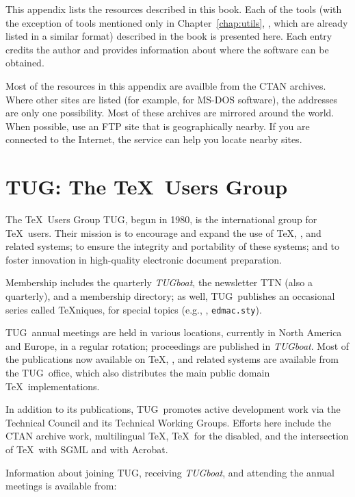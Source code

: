
This appendix lists the resources described in this book.  Each of the tools
(with the exception of tools mentioned only in Chapter~\ref{chap:utils},
\textit{}, which are already listed in a similar format)
described in the book is presented here.  Each entry credits the author and
provides information about where the software can be obtained.

Most of the resources in this appendix are availble from the CTAN archives.
Where other sites are listed (for example,  for
MS-DOS software), the addresses are only one possibility.  Most of these
archives are mirrored around the world.  When possible, use an FTP site
that is geographically nearby.  If you are connected to the Internet, the
 service can help you locate nearby sites.

\section{TUG: The \TeX\ Users Group}

\def\tug{{\sc TUG}}
\def\TUB{{\sl TUGboat\/}}

The \TeX\ Users Group \tug, begun in 1980, is the
international group for \TeX\ users. Their mission is to encourage and
expand the use of \TeX, \MF, and related systems; to ensure the
integrity and portability of these systems; and to foster innovation
in high-quality electronic document preparation.

Membership includes the quarterly \TUB, the newsletter TTN (also a
quarterly), and a membership directory; as well, \tug\ publishes an
occasional series called \TeX{}niques, for special topics (e.g.,
\PiCTeX, {\tt edmac.sty}).

\tug\ annual meetings are held in various locations, currently
in North America and Europe, in a regular rotation; proceedings are
published in \TUB. Most of the publications now available on \TeX,
\MF, and related systems are available from the \tug\ office, which
also distributes the main public domain \TeX\ implementations.

In addition to its publications, \tug\ promotes active development
work via the Technical Council and its Technical Working Groups.
\pagebreak
Efforts here include the CTAN archive work, multilingual \TeX, \TeX\
for the disabled, and the intersection of \TeX\ with SGML and with
Acrobat.

Information about joining \tug, receiving \TUB, and attending the
annual meetings is available from:


